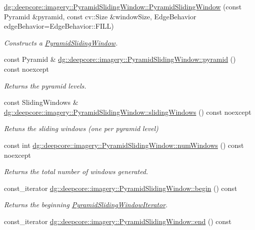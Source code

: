 \begin{DoxyCompactItemize}
\hyperlink{group___imagery_module_gac631dfe3960fc55db1cd264b508d7927}{dg\+::deepcore\+::imagery\+::\+Pyramid\+Sliding\+Window\+::\+Pyramid\+Sliding\+Window} (const Pyramid \&pyramid, const cv\+::\+Size \&window\+Size, Edge\+Behavior edge\+Behavior=Edge\+Behavior\+::\+F\+I\+LL)
\begin{DoxyCompactList}\small\item\em Constructs a \hyperlink{classdg_1_1deepcore_1_1imagery_1_1_pyramid_sliding_window}{Pyramid\+Sliding\+Window}. \end{DoxyCompactList}\item 
const Pyramid \& \hyperlink{group___imagery_module_ga5e94310b058604eb1df583996f97dd14}{dg\+::deepcore\+::imagery\+::\+Pyramid\+Sliding\+Window\+::pyramid} () const noexcept
\begin{DoxyCompactList}\small\item\em Returns the pyramid levels. \end{DoxyCompactList}\item 
const Sliding\+Windows \& \hyperlink{group___imagery_module_gaf36171178d54eeed0b910aede8fd1933}{dg\+::deepcore\+::imagery\+::\+Pyramid\+Sliding\+Window\+::sliding\+Windows} () const noexcept
\begin{DoxyCompactList}\small\item\em Retuns the sliding windows (one per pyramid level) \end{DoxyCompactList}\item 
const int \hyperlink{group___imagery_module_gaced848a3140b83deb89ba3ba522bdfa9}{dg\+::deepcore\+::imagery\+::\+Pyramid\+Sliding\+Window\+::num\+Windows} () const noexcept
\begin{DoxyCompactList}\small\item\em Returns the total number of windows generated. \end{DoxyCompactList}\item 
const\+\_\+iterator \hyperlink{group___imagery_module_gac0245ad134745b2621ecc95ca7aa5219}{dg\+::deepcore\+::imagery\+::\+Pyramid\+Sliding\+Window\+::begin} () const 
\begin{DoxyCompactList}\small\item\em Returns the beginning \hyperlink{classdg_1_1deepcore_1_1imagery_1_1_pyramid_sliding_window_iterator}{Pyramid\+Sliding\+Window\+Iterator}. \end{DoxyCompactList}\item 
const\+\_\+iterator \hyperlink{group___imagery_module_gaf39101c886a6ca5194201848f7d6d831}{dg\+::deepcore\+::imagery\+::\+Pyramid\+Sliding\+Window\+::end} () const 

\end{DoxyCompactItemize}
